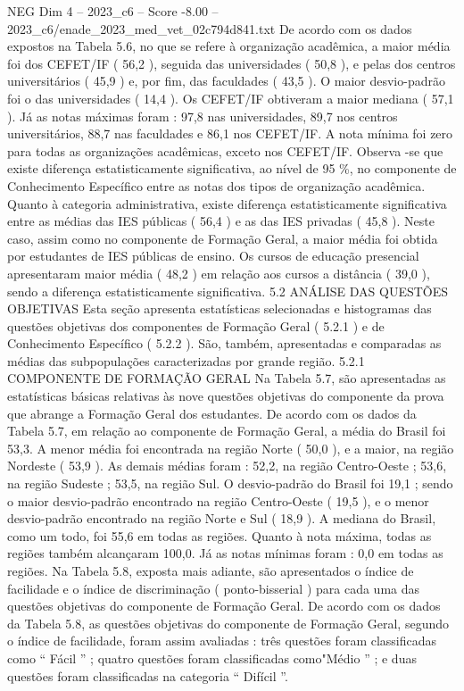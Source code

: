 \begin{textsample}{NEG Dim 4 – 2023\_c6 – Score -8.00 – 2023\_c6/enade\_2023\_med\_vet\_02c794d841.txt}
De acordo com os dados expostos na Tabela 5.6, no que se refere à organização acadêmica, a maior média foi dos CEFET/IF ( 56,2 ), seguida das universidades ( 50,8 ), e pelas dos centros universitários ( 45,9 ) e, por fim, das faculdades ( 43,5 ).
O maior desvio-padrão foi o das universidades ( 14,4 ).
Os CEFET/IF obtiveram a maior mediana ( 57,1 ).
Já as notas máximas foram : 97,8 nas universidades, 89,7 nos centros universitários, 88,7 nas faculdades e 86,1 nos CEFET/IF.
A nota mínima foi zero para todas as organizações acadêmicas, exceto nos CEFET/IF.
Observa -se que existe diferença estatisticamente significativa, ao nível de 95 \%, no componente de Conhecimento Específico entre as notas dos tipos de organização acadêmica.
Quanto à categoria administrativa, existe diferença estatisticamente significativa entre as médias das IES públicas ( 56,4 ) e as das IES privadas ( 45,8 ).
Neste caso, assim como no componente de Formação Geral, a maior média foi obtida por estudantes de IES públicas de ensino.
Os cursos de educação presencial apresentaram maior média ( 48,2 ) em relação aos cursos a distância ( 39,0 ), sendo a diferença estatisticamente significativa. 5.2 ANÁLISE DAS QUESTÕES OBJETIVAS Esta seção apresenta estatísticas selecionadas e histogramas das questões objetivas dos componentes de Formação Geral ( 5.2.1 ) e de Conhecimento Específico ( 5.2.2 ).
São, também, apresentadas e comparadas as médias das subpopulações caracterizadas por grande região. 5.2.1 COMPONENTE DE FORMAÇÃO GERAL Na Tabela 5.7, são apresentadas as estatísticas básicas relativas às nove questões objetivas do componente da prova que abrange a Formação Geral dos estudantes.
De acordo com os dados da Tabela 5.7, em relação ao componente de Formação Geral, a média do Brasil foi 53,3.
A menor média foi encontrada na região Norte ( 50,0 ), e a maior, na região Nordeste ( 53,9 ).
As demais médias foram : 52,2, na região Centro-Oeste ; 53,6, na região Sudeste ; 53,5, na região Sul.
O desvio-padrão do Brasil foi 19,1 ; sendo o maior desvio-padrão encontrado na região Centro-Oeste ( 19,5 ), e o menor desvio-padrão encontrado na região Norte e Sul ( 18,9 ).
A mediana do Brasil, como um todo, foi 55,6 em todas as regiões.
Quanto à nota máxima, todas as regiões também alcançaram 100,0.
Já as notas mínimas foram : 0,0 em todas as regiões.
Na Tabela 5.8, exposta mais adiante, são apresentados o índice de facilidade e o índice de discriminação ( ponto-bisserial ) para cada uma das questões objetivas do componente de Formação Geral.
De acordo com os dados da Tabela 5.8, as questões objetivas do componente de Formação Geral, segundo o índice de facilidade, foram assim avaliadas : três questões foram classificadas como “ Fácil ” ; quatro questões foram classificadas como"Médio ” ; e duas questões foram classificadas na categoria “ Difícil ”.

\end{textsample}

